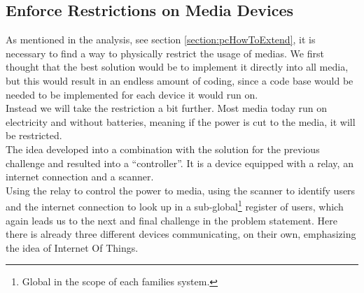 \subsection{Enforce Restrictions on Media Devices}
As mentioned in the analysis, see section \ref{section:pcHowToExtend}, it is necessary to find a way to physically restrict the usage of medias. We first thought that the best solution would be to implement it directly into all media, but this would result in an endless amount of coding, since a code base would be needed to be implemented for each device it would run on.\\
Instead we will take the restriction a bit further. Most media today run on electricity and without batteries, meaning if the power is cut to the media, it will be restricted.\\
The idea developed into a combination with the solution for the previous challenge and resulted into a ``controller''. It is a device equipped with a relay, an internet connection and a scanner.\\
Using the relay to control the power to media, using the scanner to identify users and the internet connection to look up in a sub-global\footnote{Global in the scope of each families system.} register of users, which again leads us to the next and final challenge in the problem statement. Here there is already three different devices communicating, on their own, emphasizing the idea of Internet Of Things.

